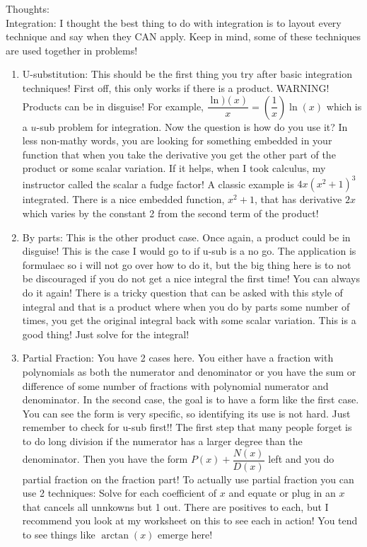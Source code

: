 \documentclass[10pt]{article}
\theoremstyle{Theorem}
\theoremstyle{definition}
\theoremstyle{remark}
\theoremstyle{custom}
\begin{document}
\thispagestyle{firststyle}
\pagestyle{plain}


\noindent Thoughts: \\
Integration: I thought the best thing to do with integration is to layout every technique and say when they CAN apply. Keep in mind, some of these techniques are used together in problems! 
\begin{enumerate}[1.]
\item U-substitution: This should be the first thing you try after basic integration techniques! First off, this only works if there is a product. WARNING! Products can be in disguise! For example, $\dfrac{\ln)(x)}{x}=\left(\dfrac{1}{x}\right)\ln(x)$ which is a $u$-sub problem for integration.  Now the question is how do you use it? In less non-mathy words, you are looking for something embedded in your function that when you take the derivative you get the other part of the product or some scalar variation. If it helps, when I took calculus, my instructor called the scalar a fudge factor! A classic example is $4x(x^2+1)^3$ integrated. There is a nice embedded function, $x^2+1$, that has derivative $2x$ which varies by the constant 2 from the second term of the product!
\item By parts: This is the other product case. Once again, a product could be in disguise! This is the case I would go to if u-sub is a no go. The application is formulaec so i will not go over how to do it, but the big thing here is to not be discouraged if you do not get a nice integral the first time! You can always do it again! There is a tricky question that can be asked with this style of integral and that is a product where when you do by parts some number of times, you get the original integral back with some scalar variation. This is a good thing! Just solve for the integral!
\item Partial Fraction: You have 2 cases here. You either have a fraction with polynomials as both the numerator and denominator or you have the sum or difference of some number of fractions with polynomial numerator and denominator. In the second case, the goal is to have a form like the first case. You can see the form is very specific, so identifying its use is not hard. Just remember to check for u-sub first!!  The first step that many people forget is to do long division if the numerator has a larger degree than the denominator. Then you have the form $P(x)+\dfrac{N(x)}{D(x)}$ left and you do partial fraction on the fraction part! To actually use partial fraction you can use 2 techniques: Solve for each coefficient of $x$ and equate or plug in an $x$ that cancels all unnkowns but 1 out. There are positives to each, but I recommend you look at my worksheet on this to see each in action! You tend to see things like $\arctan(x)$ emerge here!

\end{enumerate}
\end{document}
